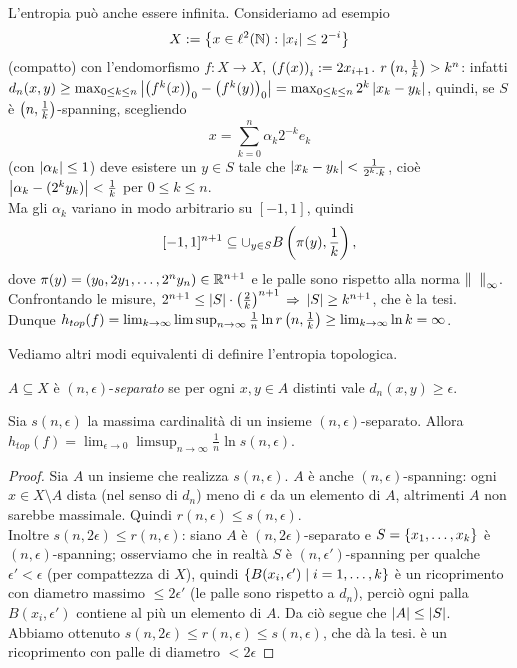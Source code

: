 \begin{esempio}L'entropia può anche essere infinita. Consideriamo ad esempio
\[ X:=\left\{x\in\ell^2(\mathbb{N}):\left|x_i\right|\le 2^{-i}\right\} \]
(compatto) con l'endomorfismo $f:X\to X$, $\left(f(x)\right)_i:=2x_{i+1}$. \Eacc $r\left(n,\frac{1}{k}\right)>k^n$:
infatti $d_n(x,y)\ge\max_{0\le k\le n}\left|\left(f^k(x)\right)_0-\left(f^k(y)\right)_0\right|=\max_{0\le k\le n}2^k\left|x_k-y_k\right|$,
quindi, se $S$ è $\left(n,\frac{1}{k}\right)$-spanning, scegliendo
\[ x=\sum_{k=0}^n\alpha_k 2^{-k}e_k \]
(con $\left|\alpha_k\right|\le 1$) deve esistere un $y\in S$ tale che $\left|x_k-y_k\right|<\frac{1}{2^k\cdot k}$,
cioè $\left|\alpha_k-(2^k y_k)\right|<\frac{1}{k}$ per $0\le k\le n$. \\
Ma gli $\alpha_k$ variano in modo arbitrario su $[-1,1]$, quindi
\[ [-1,1]^{n+1}\subseteq \cup_{y\in S}B\left(\pi(y),\frac{1}{k}\right), \]
dove $\pi(y)=(y_0,2y_1,\dots,2^n y_n)\in \mathbb{R}^{n+1}$ e le palle sono rispetto alla norma $\norm{\fantasma{a}}_\infty$.
Confrontando le misure, $2^{n+1}\le \left|S\right|\cdot\left(\frac{2}{k}\right)^{n+1}$ $\Rightarrow$ $\left|S\right|\ge k^{n+1}$, che è la tesi. \\
Dunque $h_{top}(f)=\lim_{k\to\infty}\limsup_{n\to\infty}\frac{1}{n}\ln r\left(n,\frac{1}{k}\right)\ge\lim_{k\to\infty}\ln k=\infty$.
\end{esempio}

Vediamo altri modi equivalenti di definire l'entropia topologica.

\begin{defi}$A\subseteq X$ è $(n,\epsilon)$-\emph{separato} se per ogni $x,y\in A$ distinti
vale $d_n(x,y)\ge\epsilon$.
\end{defi}

\begin{prop}Sia $s(n,\epsilon)$ la massima cardinalità di un insieme $(n,\epsilon)$-separato.
Allora $h_{top}(f)=\lim_{\epsilon\to 0}\limsup_{n\to\infty}\frac{1}{n}\ln s(n,\epsilon)$.
\end{prop}

\begin{proof}Sia $A$ un insieme che realizza $s(n,\epsilon)$. $A$ è anche $(n,\epsilon)$-spanning:
ogni $x\in X\setminus A$ dista (nel senso di $d_n$) meno di $\epsilon$ da un elemento di $A$, altrimenti $A$
non sarebbe massimale. Quindi $r(n,\epsilon)\le s(n,\epsilon)$. \\
Inoltre $s(n,2\epsilon)\le r(n,\epsilon)$: siano $A$ è $(n,2\epsilon)$-separato
e $S=\left\{x_1,\dots,x_k\right\}$ è $(n,\epsilon)$-spanning; osserviamo che in realtà
$S$ è $(n,\epsilon')$-spanning per qualche $\epsilon'<\epsilon$ (per compattezza di $X$),
quindi $\left\{B(x_i,\epsilon')\mid i=1,\dots,k\right\}$ è un ricoprimento con diametro massimo $\le 2\epsilon'$
(le palle sono rispetto a $d_n$), perciò ogni palla $B(x_i,\epsilon')$ contiene al più un elemento di $A$.
Da ciò segue che $\left|A\right|\le\left|S\right|$. \\
Abbiamo ottenuto $s(n,2\epsilon)\le r(n,\epsilon)\le s(n,\epsilon)$, che dà la tesi.
è un ricoprimento con palle di diametro $<2\epsilon$
\end{proof}

